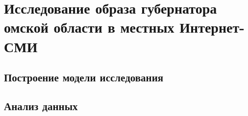 \chapter{Исследование образа губернатора омской области в местных Интернет-СМИ} \label{chapt2}
\section{Построение модели исследования} \label{sect2_1}

\section{Анализ данных} \label{sect2_2}



\clearpage